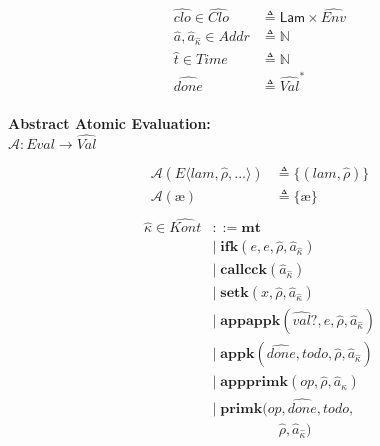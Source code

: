 \documentclass[12pt,draft]{article}
\newcommand\mae{\ensuremath{\text{\ae}}}
\begin{document}
\begin{multicols*}{2}
\begin{align*}
    \widehat{clo} \in \widehat{\textit{Clo}}
    &\triangleq \textsf{Lam} \times \widehat{\textit{Env}} \\
    \hat{a},\hat{a}_{\hat{\kappa}} \in \textit{Addr} &\triangleq \mathbb{N} \\
    \hat{t} \in \textit{Time} &\triangleq \mathbb{N} \\
    \widehat{done} &\triangleq \widehat{\textit{Val}}^* \\
  \end{align*}
  \begin{center}
    \textbf{Abstract Atomic Evaluation:} \\
    $\mathcal{A} : \textit{Eval} \rightarrow \widehat{\textit{Val}}$
  \end{center}
  \vspace{-7mm}
  \begin{align*}
    \mathcal{A}(E\langle lam , \hat{\rho} , ... \rangle)
    &\triangleq \{ (lam , \hat{\rho}) \} \\
    \mathcal{A}(\mae)
    &\triangleq \{\mae\} \\
  \end{align*}
  \vfill\null
  \columnbreak
  \begin{align*}
    \hat{\kappa} \in \widehat{\textit{Kont}} &::= \textbf{mt} \\
    &|\; \textbf{ifk}(e, e, \hat{\rho}, \hat{a}_{\hat{\kappa}}) \\
    &|\; \textbf{callcck}(\hat{a}_{\hat\kappa}) \\
    &|\; \textbf{setk}(x, \hat{\rho}, \hat{a}_{\hat{\kappa}}) \\
    &|\; \textbf{appappk}(\widehat{val}?, e, \hat{\rho}, \hat{a}_{\hat\kappa}) \\
    &|\; \textbf{appk}(\widehat{done}, todo, \hat{\rho}, \hat{a}_{\hat\kappa}) \\
    &|\; \textbf{appprimk}(op, \hat{\rho}, \hat{a}_{\hat\kappa}) \\
    &|\; \textbf{primk}(op, \widehat{done}, todo, \\
    &\;\;\;\;\;\;\;\;\;\;\;\;\;\;\;\;\;\hat{\rho}, \hat{a}_{\hat\kappa}) \\

\end{align*}
\end{multicols*}
\end{document}

